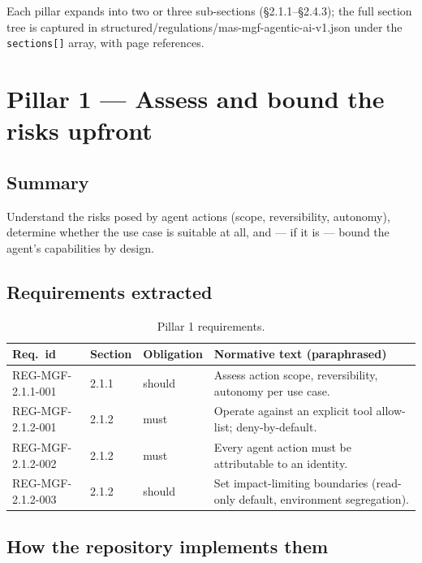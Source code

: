 \documentclass[11pt,a4paper,twoside]{report}
\newcommand{\corpus}{}
\begin{document}
Each pillar expands into two or three sub-sections (\S2.1.1--\S2.4.3); the
full section tree is captured in
\corpus{structured/regulations/mas-mgf-agentic-ai-v1.json} under the
\texttt{sections[]} array, with page references.

\section{Pillar 1 --- Assess and bound the risks upfront}
\label{sec:mgf-p1}

\subsection*{Summary}

Understand the risks posed by agent actions (scope, reversibility,
autonomy), determine whether the use case is suitable at all, and --- if
it is --- bound the agent's capabilities by design.

\subsection*{Requirements extracted}

\begin{table}[h]
\centering
\small
\begin{tabularx}{\textwidth}{p{3.2cm}p{1.4cm}p{1.6cm}X}
\toprule
\textbf{Req.\ id} & \textbf{Section} & \textbf{Obligation} & \textbf{Normative text (paraphrased)} \\
\midrule
REG-MGF-2.1.1-001 & 2.1.1 & should & Assess action scope, reversibility, autonomy per use case. \\
REG-MGF-2.1.2-001 & 2.1.2 & must   & Operate against an explicit tool allow-list; deny-by-default. \\
REG-MGF-2.1.2-002 & 2.1.2 & must   & Every agent action must be attributable to an identity. \\
REG-MGF-2.1.2-003 & 2.1.2 & should & Set impact-limiting boundaries (read-only default, environment segregation). \\
\bottomrule
\end{tabularx}
\caption{Pillar 1 requirements.}
\label{tab:p1}
\end{table}

\subsection*{How the repository implements them}
\end{document}
